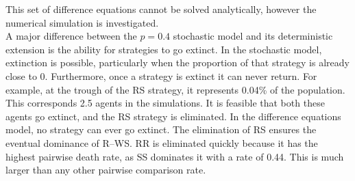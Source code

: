 This set of difference equations cannot be solved analytically, however the numerical simulation is investigated. \\
\FloatBarrier
{}
\FloatBarrier
A major difference between the $p=0.4$ stochastic model and its deterministic extension is the ability for strategies to go extinct. In the stochastic model, extinction is possible, particularly when the proportion of that strategy is already close to 0. Furthermore, once a strategy is extinct it can never return. For example, at the trough of the RS strategy, it represents 0.04\% of the population. This corresponds 2.5 agents in the simulations. It is feasible that both these agents go extinct, and the RS strategy is eliminated. In the difference equations model, no strategy can ever go extinct. The elimination of RS ensures the eventual dominance of R--WS. RR is eliminated quickly because it has the highest pairwise death rate, as SS dominates it with a rate of 0.44. This is much larger than any other pairwise comparison rate.  \\


